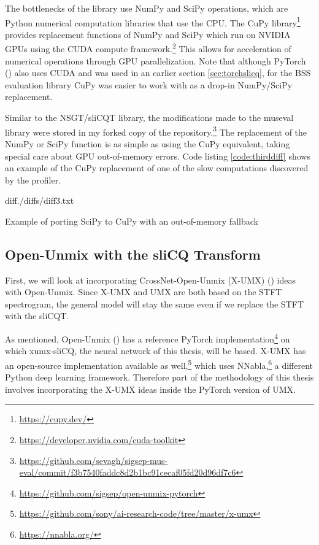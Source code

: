 \documentclass[report.tex]{subfiles}
\begin{document}
The bottlenecks of the library use NumPy and SciPy operations, which are Python numerical computation libraries that use the CPU. The CuPy library\footnote{\url{https://cupy.dev/}} provides replacement functions of NumPy and SciPy which run on NVIDIA GPUs using the CUDA compute framework.\footnote{\url{https://developer.nvidia.com/cuda-toolkit}} This allows for acceleration of numerical operations through GPU parallelization. Note that although PyTorch (\cite{pytorch}) also uses CUDA and was used in an earlier section \ref{sec:torchslicq}, for the BSS evaluation library CuPy was easier to work with as a drop-in NumPy/SciPy replacement.

Similar to the NSGT/sliCQT library, the modifications made to the museval library were stored in my forked copy of the repository.\footnote{\url{https://github.com/sevagh/sigsep-mus-eval/commit/f3b7540faddc8d2b1bc91cecaf05fd20d96df7c6}} The replacement of the NumPy or SciPy function is as simple as using the CuPy equivalent, taking special care about GPU out-of-memory errors. Code listing \ref{code:thirddiff} shows an example of the CuPy replacement of one of the slow computations discovered by the profiler.

\begin{listing}[ht]
  \centering
\begin{inputminted}[linenos,breaklines,frame=single,fontsize=\scriptsize]{diff}{./diffs/diff3.txt}
\end{inputminted}
  \caption{Example of porting SciPy to CuPy with an out-of-memory fallback}
  \label{code:thirddiff}
\end{listing}

\newpagefill

\subsection{Open-Unmix with the sliCQ Transform}
\label{sec:slicqumx}

First, we will look at incorporating CrossNet-Open-Unmix (X-UMX) (\cite{xumx}) ideas with Open-Unmix. Since X-UMX and UMX are both based on the STFT spectrogram, the general model will stay the same even if we replace the STFT with the sliCQT.

As mentioned, Open-Unmix (\cite{umx}) has a reference PyTorch implementation\footnote{\url{https://github.com/sigsep/open-unmix-pytorch}} on which xumx-sliCQ, the neural network of this thesis, will be based. X-UMX has an open-source implementation available as well,\footnote{\url{https://github.com/sony/ai-research-code/tree/master/x-umx}} which uses NNabla,\footnote{\url{https://nnabla.org/}} a different Python deep learning framework. Therefore part of the methodology of this thesis involves incorporating the X-UMX ideas inside the PyTorch version of UMX.
\end{document}
